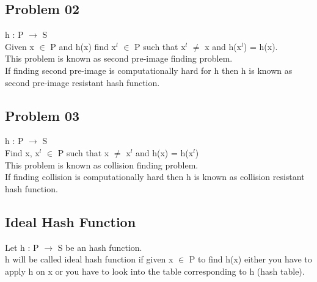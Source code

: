 \documentclass[11pt]{article}
\begin{document}
	\subsection{Problem 02}
	h : P $\rightarrow$ S\\
	Given x $\in$ P and h(x) find x$^l$ $\in$ P such that x$^l$ $\neq$ x and h(x$^l$) = h(x).\\
	This problem is known as second pre-image finding problem.\\
	If finding second pre-image is computationally hard for h then h is known as second pre-image resistant hash function.
	\subsection{Problem 03}
	h : P $\rightarrow$ S\\
	Find x, x$^l$ $\in$ P such that x $\neq$ x$^l$ and h(x) = h(x$^l$)\\
	This problem is known as collision finding problem.\\
	If finding collision is computationally hard then h is known as collision resistant hash function.
	\subsection*{Ideal Hash Function}
	Let h : P $\rightarrow$ S be an hash function.\\h will be called ideal hash function if given x $\in$ P to find h(x) either you have to apply h on x or you have to look into the table corresponding to h (hash table).
\end{document}
